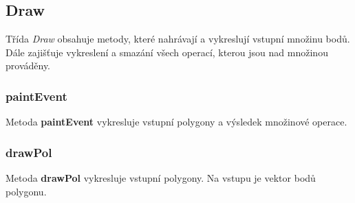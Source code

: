 \documentclass[a4paper, 12pt]{article}
\begin{document}

\subsection{Draw}
Třída \textit{Draw} obsahuje metody, které nahrávají a vykreslují vstupní množinu bodů. Dále zajišťuje vykreslení a smazání všech operací, kterou jsou nad množinou prováděny.

\subsubsection*{paintEvent}
Metoda \textbf{paintEvent} vykresluje vstupní polygony a výsledek množinové operace.

\subsubsection*{drawPol}
Metoda \textbf{drawPol} vykresluje vstupní polygony. Na vstupu je vektor bodů polygonu. 
\end{document}
